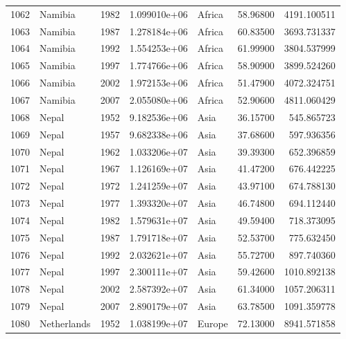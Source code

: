 \documentclass[
  letterpaper,
  DIV=11,
  numbers=noendperiod]{scrreprt}
\begin{document}
\begin{tabular}{llrrlrr}
1062 &                   Namibia &  1982 &  1.099010e+06 &    Africa &  58.96800 &    4191.100511 \\
1063 &                   Namibia &  1987 &  1.278184e+06 &    Africa &  60.83500 &    3693.731337 \\
1064 &                   Namibia &  1992 &  1.554253e+06 &    Africa &  61.99900 &    3804.537999 \\
1065 &                   Namibia &  1997 &  1.774766e+06 &    Africa &  58.90900 &    3899.524260 \\
1066 &                   Namibia &  2002 &  1.972153e+06 &    Africa &  51.47900 &    4072.324751 \\
1067 &                   Namibia &  2007 &  2.055080e+06 &    Africa &  52.90600 &    4811.060429 \\
1068 &                     Nepal &  1952 &  9.182536e+06 &      Asia &  36.15700 &     545.865723 \\
1069 &                     Nepal &  1957 &  9.682338e+06 &      Asia &  37.68600 &     597.936356 \\
1070 &                     Nepal &  1962 &  1.033206e+07 &      Asia &  39.39300 &     652.396859 \\
1071 &                     Nepal &  1967 &  1.126169e+07 &      Asia &  41.47200 &     676.442225 \\
1072 &                     Nepal &  1972 &  1.241259e+07 &      Asia &  43.97100 &     674.788130 \\
1073 &                     Nepal &  1977 &  1.393320e+07 &      Asia &  46.74800 &     694.112440 \\
1074 &                     Nepal &  1982 &  1.579631e+07 &      Asia &  49.59400 &     718.373095 \\
1075 &                     Nepal &  1987 &  1.791718e+07 &      Asia &  52.53700 &     775.632450 \\
1076 &                     Nepal &  1992 &  2.032621e+07 &      Asia &  55.72700 &     897.740360 \\
1077 &                     Nepal &  1997 &  2.300111e+07 &      Asia &  59.42600 &    1010.892138 \\
1078 &                     Nepal &  2002 &  2.587392e+07 &      Asia &  61.34000 &    1057.206311 \\
1079 &                     Nepal &  2007 &  2.890179e+07 &      Asia &  63.78500 &    1091.359778 \\
1080 &               Netherlands &  1952 &  1.038199e+07 &    Europe &  72.13000 &    8941.571858 \\

\end{tabular}
\end{document}
